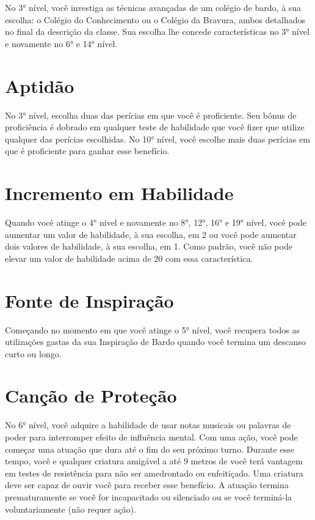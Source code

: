\documentclass{RPG_Adventure}[2021/10/20]
\begin{document}
No 3° nível, você investiga as técnicas avançadas de um colégio de bardo, à sua
escolha: o Colégio do Conhecimento ou o Colégio da Bravura, ambos detalhados no
final da descrição da classe. Sua escolha lhe concede características no 3°
nível e novamente no 6° e 14° nível.

\section*{Aptidão}%

No 3° nível, escolha duas das perícias em que você é proficiente. Seu bônus de
proficiência é dobrado em qualquer teste de habilidade que você fizer que
utilize qualquer das perícias escolhidas.
No 10° nível, você escolhe mais duas perícias em que é proficiente para ganhar
esse benefício.

\section*{Incremento em Habilidade}%

Quando você atinge o 4° nível e novamente no 8°, 12°, 16° e 19° nível, você pode
aumentar um valor de habilidade, à sua escolha, em 2 ou você pode aumentar dois
valores de habilidade, à sua escolha, em 1. Como padrão, você não pode elevar um
valor de habilidade acima de 20 com essa característica.

\section*{Fonte de Inspiração}%

Começando no momento em que você atinge o 5° nível, você recupera todos as
utilizações gastas da sua Inspiração de Bardo quando você termina um descanso
curto ou longo.

\section*{Canção de Proteção}%

No 6° nível, você adquire a habilidade de usar notas musicais ou palavras de
poder para interromper efeito de influência mental. Com uma ação, você pode
começar uma atuação que dura até o fim do seu próximo turno. Durante esse tempo,
você e qualquer criatura amigável a até 9 metros de você terá vantagem em testes
de resistência para não ser amedrontado ou enfeitiçado. Uma criatura deve ser
capaz de ouvir você para receber esse benefício.
A atuação termina prematuramente se você for incapacitado ou silenciado ou se
você terminá-la voluntariamente (não requer ação).
\end{document}
